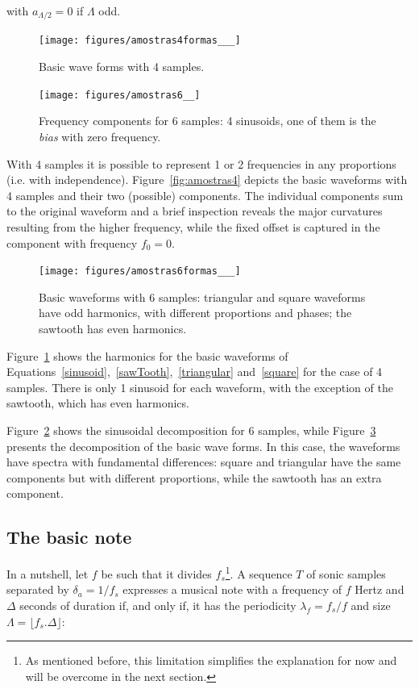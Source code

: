 \noindent with $a_{\Lambda/2}=0$ if $\Lambda$ odd.

\begin{figure}
    \centering
        \texttt{[image: figures/amostras4formas\_\_\_]}
    \caption{Basic wave forms with 4 samples.}
        \label{fig:formas4}
\end{figure}

\begin{figure}[!h!]
    \centering
        \texttt{[image: figures/amostras6\_\_]}
    \caption{Frequency components for 6 samples: 4 sinusoids, one of them is the \emph{bias} with zero frequency.}
        \label{fig:amostras6}
\end{figure}

With 4 samples it is possible to represent 1 or 2 frequencies in any proportions (i.e. with independence). Figure~\ref{fig:amostras4} depicts the basic waveforms with 4 samples and their two (possible) components. The individual components sum to the original waveform and a brief inspection reveals the major curvatures resulting from the higher frequency, while the fixed offset is captured in the component with frequency $f_0=0$.

\begin{figure}[!h!]
    \centering
        \texttt{[image: figures/amostras6formas\_\_\_]}
    \caption{Basic waveforms with 6 samples: triangular and square waveforms have odd harmonics, with different proportions and phases; the sawtooth has even harmonics.}
        \label{fig:formas6}
\end{figure}

Figure~\ref{fig:formas4} shows the harmonics for the basic waveforms of Equations~\ref{sinusoid},~\ref{sawTooth},~\ref{triangular} and~\ref{square} for the case of 4 samples. There is only 1 sinusoid for each waveform, with the exception of the sawtooth, which has even harmonics.

Figure~\ref{fig:amostras6} shows the sinusoidal decomposition for 6 samples, while Figure~\ref{fig:formas6} presents the decomposition of the basic wave forms. In this case, the waveforms have spectra with fundamental differences: square and triangular have the same components but with different proportions, while the sawtooth has an extra component.

\subsection{The basic note}\label{notaBasica}
In a nutshell, let $f$ be such that it divides $f_s$\footnote{As mentioned before, this limitation simplifies the explanation for now and will be overcome in the next section.}. A sequence $T$ of sonic samples separated by $\delta_a=1/f_s$ expresses a musical note with a frequency of $f$ Hertz and $\Delta$ seconds of duration if, and only if, it has the periodicity $\lambda_f=f_s/f$ and size $\Lambda=\lfloor f_s . \Delta \rfloor$:

